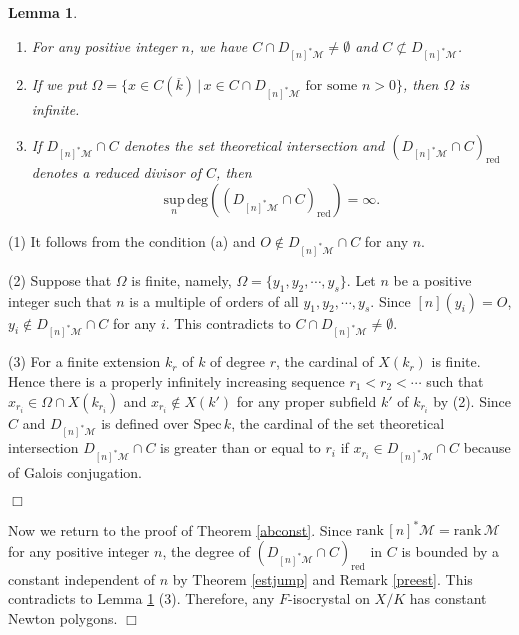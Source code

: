\documentclass[11pt]{amsart}
\newtheorem{lemma}[Lemma]{Lemma}
\begin{document}
\begin{lemma}\label{cont} 
\begin{enumerate}
\item For any positive integer $n$, we have $C \cap D_{[n]^\ast\mathcal M} \ne \emptyset$ 
and $C \not\subset D_{[n]^\ast\mathcal M}$. 
\item If we put $\Omega = \{ x \in C(\overline{k})\, |\, x \in C \cap D_{[n]^\ast\mathcal M}\, \, \mbox{for some}\, \, n > 0\}$, 
then $\Omega$ is infinite. 
\item If $D_{[n]^\ast\mathcal M} \cap C$ denotes the set theoretical intersection 
and $(D_{[n]^\ast\mathcal M} \cap C)_{\mathrm{red}}$ denotes a reduced divisor of $C$, then 
$$
   \underset{n}{\mathrm{sup}}\, \mathrm{deg}((D_{[n]^\ast\mathcal M} \cap C)_{\mathrm{red}}) = \infty. 
$$
\end{enumerate}
\end{lemma}

{ {(1) It follows from the condition (a) and $O \not\in D_{[n]^\ast\mathcal M} \cap C$ for any $n$. 

(2) Suppose that $\Omega$ is finite, namely, $\Omega = \{ y_1, y_2, \cdots, y_s\}$. 
Let $n$ be a positive integer such that $n$ is a multiple of orders of all $y_1, y_2, \cdots, y_s$. 
Since $[n](y_i) = O$, $y_i \not\in D_{[n]^\ast\mathcal M} \cap C$ for any $i$. 
This contradicts to $C \cap D_{[n]^\ast\mathcal M} \ne \emptyset$. 

(3) For a finite extension $k_r$ of $k$ of degree $r$, the cardinal of $X(k_r)$ is finite. Hence 
there is a properly infinitely increasing sequence $r_1 < r_2 < \cdots$ such that 
$x_{r_i} \in \Omega \cap X(k_{r_i})$ and $x_{r_i} \not\in X(k')$ 
for any proper subfield $k'$ of $k_{r_i}$ by (2). Since 
$C$ and $D_{[n]^\ast\mathcal M}$ is defined over $\mathrm{Spec}\, k$, 
the cardinal of the set theoretical intersection $D_{[n]^\ast\mathcal M} \cap C$ is greater than or equal to $r_i$ 
if $x_{r_i} \in D_{[n]^\ast\mathcal M} \cap C$ because of Galois conjugation. 
} \hspace*{\fill} $\Box$}

\vspace*{3mm}

Now we return to the proof of Theorem \ref{abconst}. 
Since $\mathrm{rank}\, [n]^\ast\mathcal M = \mathrm{rank}\, \mathcal M$ for any positive integer $n$, the 
degree of $(D_{[n]^\ast\mathcal M} \cap C)_{\mathrm{red}}$ in $C$ is bounded 
by a constant independent of $n$ by Theorem \ref{estjump} and Remark \ref{preest}. 
This contradicts to Lemma \ref{cont} (3). 
Therefore, any $F$-isocrystal on $X/K$ has constant Newton polygons. 
\hspace*{\fill} $\Box$
\end{document}
